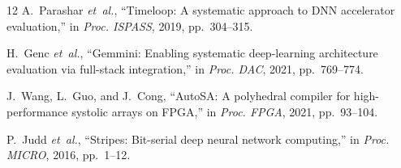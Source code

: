 \documentclass[10pt,letterpaper,twocolumn]{article}
\begin{document}
\begin{thebibliography}{12}
A.~Parashar \emph{et~al.}, ``Timeloop: A systematic approach to DNN accelerator evaluation,'' in \emph{Proc. ISPASS}, 2019, pp.~304--315.

H.~Genc \emph{et~al.}, ``Gemmini: Enabling systematic deep-learning architecture evaluation via full-stack integration,'' in \emph{Proc. DAC}, 2021, pp.~769--774.

J.~Wang, L.~Guo, and J.~Cong, ``AutoSA: A polyhedral compiler for high-performance systolic arrays on FPGA,'' in \emph{Proc. FPGA}, 2021, pp.~93--104.

P.~Judd \emph{et~al.}, ``Stripes: Bit-serial deep neural network computing,'' in \emph{Proc. MICRO}, 2016, pp.~1--12.

\end{thebibliography}
\end{document}
